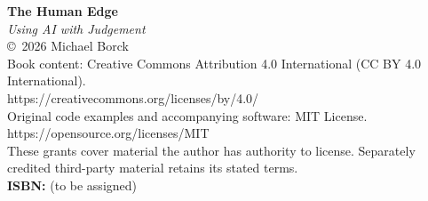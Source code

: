 \thispagestyle{empty}
\vspace*{2in}
\begin{center}
\textbf{\large The Human Edge}\\[0.3em]
\textit{Using AI with Judgement}\\[1em]
\copyright\ 2026 Michael Borck\\[0.5em]
Book content: Creative Commons Attribution 4.0 International (CC BY 4.0 International).\\
https://creativecommons.org/licenses/by/4.0/\\[0.5em]
Original code examples and accompanying software: MIT License.\\
https://opensource.org/licenses/MIT\\[0.5em]
These grants cover material the author has authority to license. Separately credited third-party material retains its stated terms.\\[1em]
\textbf{ISBN:} (to be assigned)\\[1em]
\end{center}
\clearpage
